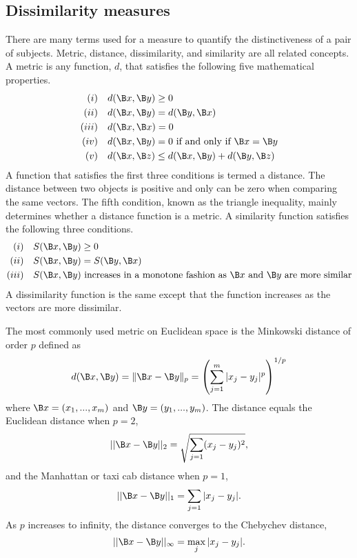 \subsection{Dissimilarity measures}
There are many terms used for a measure to quantify the distinctiveness of a pair of subjects. Metric, distance, dissimilarity, and similarity are all related concepts. A metric is any function, $d$, that satisfies the following five mathematical properties.
\begin{align*}
(i)& \quad d(\B x,\B y)\geq 0 \\
(ii)& \quad d(\B x,\B y) = d(\B y,\B x)\\
(iii)&\quad d(\B x,\B x) = 0\\
(iv)&\quad d(\B x,\B y) = 0\text{ if and only if } \B x=\B y\\
(v)&\quad d(\B x,\B z) \leq d(\B x,\B y) + d(\B y,\B z)
\end{align*}
A function that satisfies the first three conditions is termed a distance. The distance between two objects is positive and only can be zero when comparing the same vectors. The fifth condition, known as the triangle inequality, mainly determines whether a distance function is a metric. A similarity function satisfies the following three conditions.
\begin{align*}
(i)&\quad S(\B x,\B y)\geq 0 \\
(ii)&\quad S(\B x,\B y) = S(\B y,\B x)\\
(iii)& \quad S(\B x,\B y)\text{ increases in a monotone fashion as }\B x\text{ and }\B y\text{ are more similar}
\end{align*}
A dissimilarity function is the same except that the function increases as the vectors are more dissimilar. 

The most commonly used metric on Euclidean space is the Minkowski distance of order $p$ defined as
$$d(\B x,\B y) = \|\B x - \B y\|_{p} = \left(\sum^{m}_{j=1}|x_{j}-y_{j}|^{p}\right)^{1/p}$$
where $\B x = (x_{1},...,x_{m})$ and $\B y = (y_{1},...,y_{m})$. The distance equals the Euclidean distance when $p=2$,
$$||\B x - \B y||_{2}=\sqrt{\sum_{j=1}(x_{j}-y_{j})^{2}},$$
and the Manhattan or taxi cab distance when $p=1$,
$$||\B x - \B y||_{1}=\sum_{j=1}|x_{j}-y_{j}|.$$
As $p$ increases to infinity, the distance converges to the Chebychev distance,
$$||\B x - \B y||_{\infty}=\max_{j}|x_{j}-y_{j}|.$$

